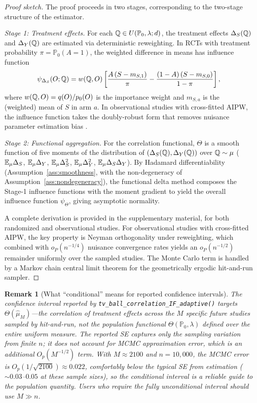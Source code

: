 \documentclass{article}
\newtheorem{remark}{Remark}
\newcommand{\PP}{\mathbb{P}}
\begin{document}
\begin{proof}[Proof sketch]
The proof proceeds in two stages, corresponding to the two-stage structure of the estimator.

\textit{Stage 1: Treatment effects.} For each $\Q \in U(\PP_0, \lambda; d)$, the treatment effects $\Delta_S(\mathbb{Q})$ and $\Delta_Y(\mathbb{Q})$ are estimated via deterministic reweighting. In RCTs with treatment probability $\pi = \PP_0(A=1)$, the weighted difference in means has influence function
\[
    \psi_{\Delta_S}(O; \mathbb{Q}) = w(\mathbb{Q}, O) \left[\frac{A\,(S - m_{S,1})}{\pi} - \frac{(1-A)\,(S - m_{S,0})}{1-\pi}\right],
\]
where $w(\mathbb{Q}, O) = q(O)/p_0(O)$ is the importance weight and $m_{S,a}$ is the (weighted) mean of $S$ in arm $a$. In observational studies with cross-fitted AIPW, the influence function takes the doubly-robust form that removes nuisance parameter estimation bias \citep{chernozhukov2018,kennedy2016}.

\textit{Stage 2: Functional aggregation.} For the correlation functional, $\Theta$ is a smooth function of five moments of the distribution of $(\Delta_S(\mathbb{Q}), \Delta_Y(\mathbb{Q}))$ over $\mathbb{Q} \sim \mu$ ($\mathbb{E}_\mu \Delta_S$, $\mathbb{E}_\mu \Delta_Y$, $\mathbb{E}_\mu \Delta_S^2$, $\mathbb{E}_\mu \Delta_Y^2$, $\mathbb{E}_\mu \Delta_S\Delta_Y$). By Hadamard differentiability (Assumption~\ref{ass:smoothness}, with the non-degeneracy of Assumption~\ref{ass:nondegeneracy}), the functional delta method composes the Stage-1 influence functions with the moment gradient to yield the overall influence function $\psi_\Theta$, giving asymptotic normality.

A complete derivation is provided in the supplementary material, for both randomized and observational studies. For observational studies with cross-fitted AIPW, the key property is Neyman orthogonality under reweighting, which combined with $o_P(n^{-1/4})$ nuisance convergence rates yields an $o_P(n^{-1/2})$ remainder uniformly over the sampled studies. The Monte Carlo term is handled by a Markov chain central limit theorem for the geometrically ergodic hit-and-run sampler.
\end{proof}

\begin{remark}[What ``conditional'' means for reported confidence intervals]\label{rem:conditional-inference}
The confidence interval reported by \texttt{tv\_ball\_correlation\_IF\_adaptive()}
targets $\Theta(\hat{\mu}_M)$---the correlation of treatment effects across the
$M$ specific future studies sampled by hit-and-run, not the population functional
$\Theta(\PP_0,\lambda)$ defined over the entire uniform measure. The reported SE
captures only the \emph{sampling variation} from finite $n$; it does not account
for MCMC approximation error, which is an additional $O_p(M^{-1/2})$ term. With
$M \approx 2100$ and $n = 10{,}000$, the MCMC error is $O_p(1/\sqrt{2100}) \approx 0.022$,
comfortably below the typical SE from estimation ($\sim 0.03$--$0.05$ at these sample sizes),
so the conditional interval is a reliable guide to the population quantity. Users
who require the fully unconditional interval should use $M \gg n$.
\end{remark}
\end{document}
